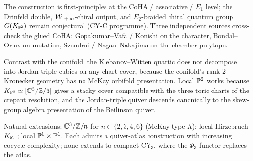 The construction is first-principles at the CoHA / associative / $E_1$
level; the Drinfeld double, $\mathcal{W}_{1+\infty}$-chiral output, and $E_2$-braided
chiral quantum group $G(K_{\mathbb{P}^2})$ remain conjectural (CY-C
programme). Three independent sources cross-check the glued CoHA:
Gopakumar--Vafa / Konishi on the character, Bondal--Orlov on
mutation, Szendroi / Nagao--Nakajima on the chamber polytope.

Contrast with the conifold: the Klebanov--Witten quartic does not
decompose into Jordan-triple cubics on any chart cover, because the
conifold's rank-$2$ Kronecker geometry has no McKay orbifold
presentation. Local $\mathbb{P}^2$ works because
$K_{\mathbb{P}^2}\simeq[\mathbb{C}^3/\mathbb{Z}/3]$ gives a stacky cover compatible with the
three toric charts of the crepant resolution, and the Jordan-triple
quiver descends canonically to the skew-group algebra presentation of
the Beilinson quiver.

Natural extensions: $\mathbb{C}^3/\mathbb{Z}/n$ for $n\in\{2,3,4,6\}$ (McKay type A);
local Hirzebruch $K_{\mathbb{F}_n}$; local $\mathbb{P}^1\times\mathbb{P}^1$. Each admits a
quiver-atlas construction with increasing cocycle complexity; none
extends to compact CY$_3$, where the $\Phi_3$ functor replaces the
atlas.
